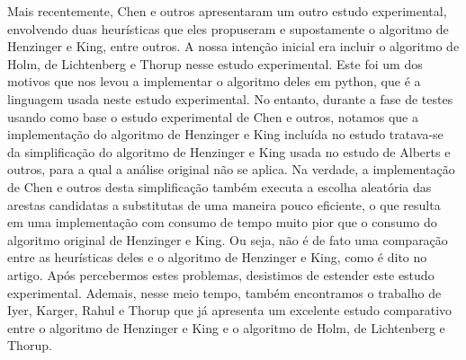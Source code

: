 Mais recentemente, Chen e outros apresentaram um outro estudo experimental, envolvendo duas heurísticas que eles propuseram e supostamente o algoritmo de Henzinger e King, entre outros.
A nossa intenção inicial era incluir o algoritmo de Holm, de Lichtenberg e Thorup nesse estudo experimental. Este foi um dos motivos que nos levou a implementar o algoritmo deles em python, que é a linguagem usada neste estudo experimental. No entanto, durante a fase de testes usando como base o estudo experimental de Chen e outros, notamos que a implementação do algoritmo de Henzinger e King incluída no estudo tratava-se da simplificação do algoritmo de Henzinger e King usada no estudo de Alberts e outros, para a qual a análise original não se aplica. Na verdade, a implementação de Chen e outros desta simplificação também executa a escolha aleatória das arestas candidatas a substitutas de uma maneira pouco eficiente, o que resulta em uma implementação com consumo de tempo muito pior que o consumo do algoritmo original de Henzinger e King. Ou seja, não é de fato uma comparação entre as heurísticas deles e o algoritmo de Henzinger e King, como é dito no artigo. Após percebermos estes problemas, desistimos de estender este estudo experimental. Ademais, nesse meio tempo, também encontramos o trabalho de Iyer, Karger, Rahul e Thorup que já apresenta um excelente estudo comparativo entre o algoritmo de Henzinger e King e o algoritmo de Holm, de Lichtenberg e Thorup. 


